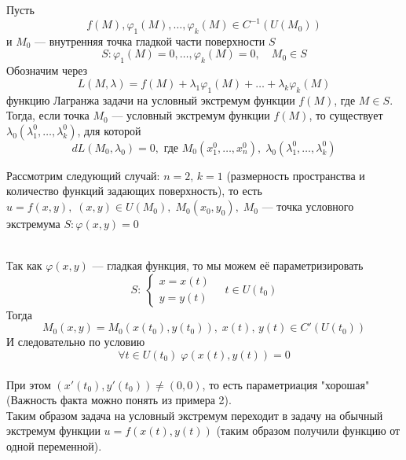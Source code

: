 \begin{Th}
    Пусть 
    \[
        f(M), \varphi_1(M), \dots, \varphi_k(M) \in C^{-1}(U(M_0))
    \] 
    и $M_0$ --- внутренняя точка гладкой части поверхности $S$ 
    \[
    S: \varphi_1(M) = 0, \dots, \varphi_k(M) = 0, \quad M_0 \in S
    \]
    Обозначим через 
    \[
        L(M, \lambda) = f(M) + \lambda_1\varphi_1(M) + \dots + \lambda_k\varphi_k(M)
    \]
    функцию Лагранжа задачи на условный экстремум функции $f(M)$, где $M \in S$. Тогда, если точка $M_0$ --- условный экстремум функции $f(M)$, то существует $\lambda_0(\lambda^0_1, \dots, \lambda^0_k)$, для которой
    \[
        dL(M_0, \lambda_0) = 0, \text{ где }  M_0(x^0_1, \dots, x^0_n), \; \lambda_0(\lambda^0_1, \dots, \lambda^0_k)
    \]
\end{Th}
\begin{Proof}
    Рассмотрим следующий случай: $n = 2, \, k = 1$ (размерность пространства и количество функций задающих поверхность), то есть $u = f(x, y), \; (x, y) \in U(M_0), \; M_0(x_0, y_0), \; M_0$ --- точка условного экстремума $S : \varphi(x, y) = 0$
    \begin{figure}[h!]
        \noindent{}
    \end{figure}\\
    Так как $\varphi(x, y)$ --- гладкая функция, то мы можем её параметризировать
    \[
        S :\: \begin{cases} 
            x = x(t)\\
            y = y(t)
          \end{cases} \quad t \in U(t_0)
    \]
    Тогда 
    \[
        M_0(x, y) = M_0(x(t_0), y(t_0)), \; x(t), \, y(t) \in C'(U(t_0))
    \]
    И следовательно по условию 
    \[
        \forall t \in U(t_0) \; \varphi(x(t), y(t)) = 0
    \]\\
    При этом $(x'(t_0), y'(t_0)) \neq (0, 0)$, то есть параметриация "хорошая" (Важность факта можно понять из примера 2).\\
    Таким образом задача на условный экстремум переходит в задачу на обычный экстремум функции $u = f(x(t), y(t))$ (таким образом получили функцию от одной переменной).\\

\end{Proof}
